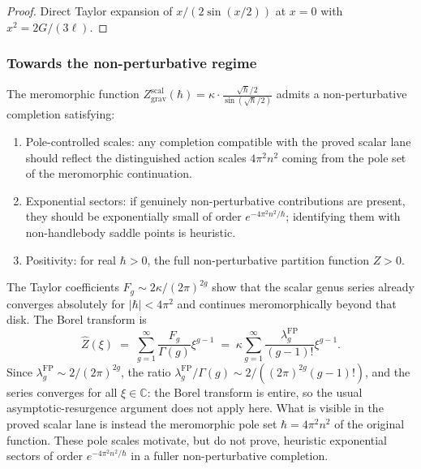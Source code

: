 \begin{proof}
Direct Taylor expansion of $x/(2\sin(x/2))$ at $x = 0$ with $x^2 = 2G/(3\ell)$.
\end{proof}

\subsubsection{Towards the non-perturbative regime}

\begin{conjecture}
\label{conj:thqg-I-non-perturbative}
The meromorphic function $Z^{\mathrm{scal}}_{\mathrm{grav}}(\hbar) = \kappa \cdot \frac{\sqrt{\hbar}/2}{\sin(\sqrt{\hbar}/2)}$ admits a non-perturbative completion satisfying:
\begin{enumerate}[label=\textup{(\roman*)}]
\item Pole-controlled scales: any completion compatible with the proved scalar lane should reflect the distinguished action scales $4\pi^2 n^2$ coming from the pole set of the meromorphic continuation.
\item Exponential sectors: if genuinely non-perturbative contributions are present, they should be exponentially small of order $e^{-4\pi^2 n^2/\hbar}$; identifying them with non-handlebody saddle points is heuristic.
\item Positivity: for real $\hbar > 0$, the full non-perturbative partition function $Z > 0$.
\end{enumerate}
\end{conjecture}

\begin{evidence}
The Taylor coefficients $F_g \sim 2\kappa/(2\pi)^{2g}$ show that the scalar genus series already converges absolutely for $|\hbar| < 4\pi^2$ and continues meromorphically beyond that disk. The Borel transform is
\begin{equation}%
\hat{Z}(\xi) \;=\; \sum_{g=1}^\infty \frac{F_g}{\Gamma(g)} \xi^{g-1} \;=\; \kappa \sum_{g=1}^\infty \frac{\lambda_g^{\mathrm{FP}}}{(g-1)!} \xi^{g-1}.
\end{equation}
Since $\lambda_g^{\mathrm{FP}} \sim 2/(2\pi)^{2g}$, the ratio $\lambda_g^{\mathrm{FP}}/\Gamma(g) \sim 2/((2\pi)^{2g}(g-1)!)$, and the series converges for all $\xi \in \mathbb{C}$: the Borel transform is entire, so the usual asymptotic-resurgence argument does not apply here. What is visible in the proved scalar lane is instead the meromorphic pole set $\hbar = 4\pi^2 n^2$ of the original function. These pole scales motivate, but do not prove, heuristic exponential sectors of order $e^{-4\pi^2 n^2/\hbar}$ in a fuller non-perturbative completion.
\end{evidence}

